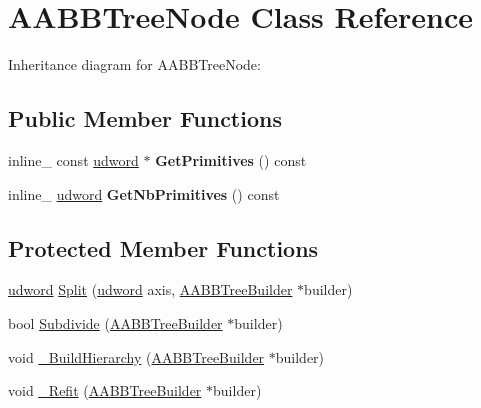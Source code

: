 \hypertarget{class_a_a_b_b_tree_node}{\section{A\+A\+B\+B\+Tree\+Node Class Reference}
\label{class_a_a_b_b_tree_node}
}


Inheritance diagram for A\+A\+B\+B\+Tree\+Node\+:
\subsection*{Public Member Functions}
\begin{DoxyCompactItemize}
\item 
\hypertarget{class_a_a_b_b_tree_node_a5657ae9a805b1f4242d3cad8d6776862}{inline\+\_\+ const \hyperlink{_ice_types_8h_a44c6f1920ba5551225fb534f9d1a1733}{udword} $\ast$ {\bfseries Get\+Primitives} () const }\label{class_a_a_b_b_tree_node_a5657ae9a805b1f4242d3cad8d6776862}

\item 
\hypertarget{class_a_a_b_b_tree_node_addab28e7f0dc9e2737f08a82148121a1}{inline\+\_\+ \hyperlink{_ice_types_8h_a44c6f1920ba5551225fb534f9d1a1733}{udword} {\bfseries Get\+Nb\+Primitives} () const }\label{class_a_a_b_b_tree_node_addab28e7f0dc9e2737f08a82148121a1}

\end{DoxyCompactItemize}
\subsection*{Protected Member Functions}
\begin{DoxyCompactItemize}
\item 
\hyperlink{_ice_types_8h_a44c6f1920ba5551225fb534f9d1a1733}{udword} \hyperlink{class_a_a_b_b_tree_node_aefc4588f956b98d324b26d9dbecc20f8}{Split} (\hyperlink{_ice_types_8h_a44c6f1920ba5551225fb534f9d1a1733}{udword} axis, \hyperlink{class_a_a_b_b_tree_builder}{A\+A\+B\+B\+Tree\+Builder} $\ast$builder)
\item 
bool \hyperlink{class_a_a_b_b_tree_node_a30febc55e0cd39f7114f02395e2a69f5}{Subdivide} (\hyperlink{class_a_a_b_b_tree_builder}{A\+A\+B\+B\+Tree\+Builder} $\ast$builder)
\item 
void \hyperlink{class_a_a_b_b_tree_node_acf08af7ca37efb06780ef3ff433effcd}{\+\_\+\+Build\+Hierarchy} (\hyperlink{class_a_a_b_b_tree_builder}{A\+A\+B\+B\+Tree\+Builder} $\ast$builder)
\item 
void \hyperlink{class_a_a_b_b_tree_node_a9b07d0707b9b2d043a60672f3c9cb47a}{\+\_\+\+Refit} (\hyperlink{class_a_a_b_b_tree_builder}{A\+A\+B\+B\+Tree\+Builder} $\ast$builder)
\end{DoxyCompactItemize}
